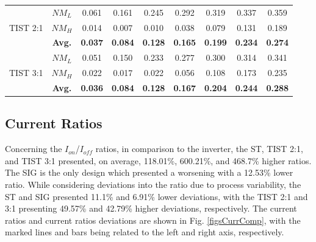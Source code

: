\documentclass[pgmicro,mestrado,english]{iiufrgs}
\begin{document}
\begin{table}[]
{\begin{tabular}{|c|c|c|c|c|c|c|c|c|}
\multirow{3}{*}{TIST 2:1} &
  $NM_{L}$ &
  0.061 &
  0.161 &
  0.245 &
  0.292 &
  0.319 &
  0.337 &
  0.359 \\ \cline{2-9}
 &
  $NM_{H}$ &
  0.014 &
  0.007 &
  0.010 &
  0.038 &
  0.079 &
  0.131 &
  0.189 \\ \cline{2-9}
 &
  \textbf{Avg.} &
  \textbf{0.037} &
  \textbf{0.084} &
  \textbf{0.128} &
  \textbf{0.165} &
  \textbf{0.199} &
  \textbf{0.234} &
  \textbf{0.274} \\ \hline
\multirow{3}{*}{TIST 3:1} &
  $NM_{L}$ &
  0.051 &
  0.150 &
  0.233 &
  0.277 &
  0.300 &
  0.314 &
  0.341 \\ \cline{2-9}
 &
  $NM_{H}$ &
  0.022 &
  0.017 &
  0.022 &
  0.056 &
  0.108 &
  0.173 &
  0.235 \\ \cline{2-9}
 &
  \textbf{Avg.} &
  \textbf{0.036} &
  \textbf{0.084} &
  \textbf{0.128} &
  \textbf{0.167} &
  \textbf{0.204} &
  \textbf{0.244} &
  \textbf{0.288} \\ \hline
\end{tabular}%
}
\end{table}

\subsection{Current Ratios}
     Concerning the $I_{on}$/$I_{off}$ ratios, in comparison to the inverter, the ST, TIST 2:1, and TIST 3:1 presented, on average, 118.01\%, 600.21\%, and 468.7\% higher ratios. The SIG is the only design which presented a worsening with a 12.53\% lower ratio. While considering deviations into the ratio due to process variability, the ST and SIG presented 11.1\% and 6.91\% lower deviations, with the TIST 2:1 and 3:1 presenting 49.57\% and 42.79\% higher deviations, respectively. The current ratios and current ratios deviations are shown in Fig. \ref{figsCurrComp}, with the marked lines and bars being related to the left and right axis, respectively.
\end{document}
